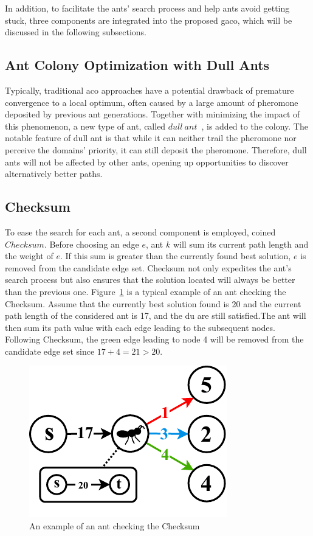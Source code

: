 In addition, to facilitate the ants’ search process and help ants avoid getting stuck, three components are integrated into the proposed \acrshort{gaco}, which will be discussed in the following subsections.

\subsection{Ant Colony Optimization with Dull Ants}
Typically, traditional \gls{aco} approaches have a potential drawback of premature convergence to a local optimum, often caused by a large amount of pheromone deposited by previous ant generations. Together with minimizing the impact of this phenomenon, a new type of ant, called $dull~ant$~\cite{shimomura2010ant}, is added to the colony. The notable feature of dull ant is that while it can neither trail the pheromone nor perceive the domains' priority, it can still deposit the pheromone. Therefore, dull ants will not be affected by other ants, opening up opportunities to discover alternatively better paths.

\subsection{Checksum}
To ease the search for each ant, a second component is employed, coined $Checksum$. Before choosing an edge $e$, ant $k$ will sum its current path length and the weight of $e$. If this sum is greater than the currently found best solution, $e$ is removed from the candidate edge set. Checksum not only expedites the ant's search process but also ensures that the solution located will always be better than the previous one.
Figure~\ref{fig:checksum} is a typical example of an ant checking the Checksum. Assume that the currently best solution found is 20 and the current path length of the considered ant is 17, and the \gls{du} are still satisfied.The ant will then sum its path value with each edge leading to the subsequent nodes. Following Checksum, the green edge leading to node 4 will be removed from the candidate edge set since $17 + 4 = 21 > 20$.

\setlength{\intextsep}{3pt}
\renewcommand{\scalefigure}{1.1}
\begin{figure}[htbp]
	\centering
	\includegraphics[scale=\scalefigure]{Figures/chap 3/CheckSum.pdf}
	\caption{An example of an ant checking the Checksum}
	\label{fig:checksum}
\end{figure}

